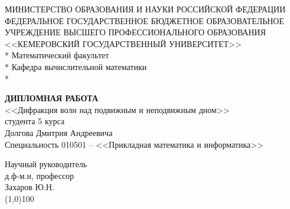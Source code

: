 \begin{titlepage}
    \newpage

    \begin{center}
	МИНИСТЕРСТВО ОБРАЗОВАНИЯ И НАУКИ РОССИЙСКОЙ ФЕДЕРАЦИИ\\
	ФЕДЕРАЛЬНОЕ ГОСУДАРСТВЕННОЕ БЮДЖЕТНОЕ ОБРАЗОВАТЕЛЬНОЕ\\
	УЧРЕЖДЕНИЕ ВЫСШЕГО ПРОФЕССИОНАЛЬНОГО ОБРАЗОВАНИЯ\\
	<<КЕМЕРОВСКИЙ ГОСУДАРСТВЕННЫЙ УНИВЕРСИТЕТ>>\\*
	Математический факультет\\*
	Кафедра вычислительной математики\\*
    \end{center}

    \vspace{8em}

    \begin{center}
	\LARGE {\bf ДИПЛОМНАЯ РАБОТА}\\
	\Large <<Дифракция волн над подвижным и неподвижным дном>> \\
	\vspace{1em}
	\normalsize студента 5 курса\\ Долгова Дмитрия Андреевича \\
	Специальность 010501 – <<Прикладная математика и информатика>>
    \end{center}

    \vspace{6em}

    \begin{flushright}
	Научный руководитель \\
	д.ф-м.н, профессор \\
	Захаров Ю.Н.\\
	\line(1,0){100} \\
    \end{flushright}

    \vspace{4em}


\end{titlepage}
